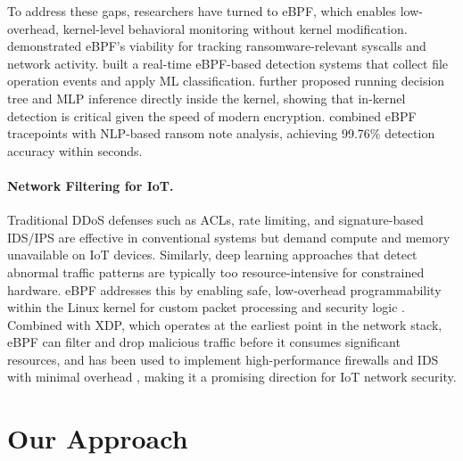 \documentclass[twocolumn, 10pt]{scrartcl}
\begin{document}
To address these gaps, researchers have turned to eBPF, which enables low-overhead, kernel-level behavioral monitoring without kernel modification. 
\cite{zhuravchak2023} demonstrated eBPF's viability for tracking ransomware-relevant syscalls and network activity. 
\cite{higuchi2023,zhuravchak2023real} built a real-time eBPF-based detection systems that collect file operation events and apply ML classification. 
\cite{philippart2024} further proposed running decision tree and MLP inference directly inside the kernel, showing that in-kernel detection is critical given the speed of modern encryption. 
\cite{sekar2024} combined eBPF tracepoints with NLP-based ransom note analysis, achieving 99.76\%  detection accuracy within seconds. 


\paragraph{Network Filtering for IoT.}
Traditional DDoS defenses such as ACLs, rate limiting, and signature-based IDS/IPS \cite{roesch1999snort, bouziani2019comparative} are effective in conventional systems but demand compute and memory unavailable on IoT devices. Similarly, deep learning approaches that detect abnormal traffic patterns \cite{niyaz2016deep, abdulrahman2025deep} are typically too resource-intensive for constrained hardware. eBPF addresses this by enabling safe, low-overhead programmability within the Linux kernel for custom packet processing and security logic \cite{vieira2020fast}. Combined with XDP, which operates at the earliest point in the network stack, eBPF can filter and drop malicious traffic before it consumes significant resources, and has been used to implement high-performance firewalls and IDS with minimal overhead \cite{hadi2024ikern}, making it a promising direction for IoT network security.

\section{Our Approach}
\end{document}
